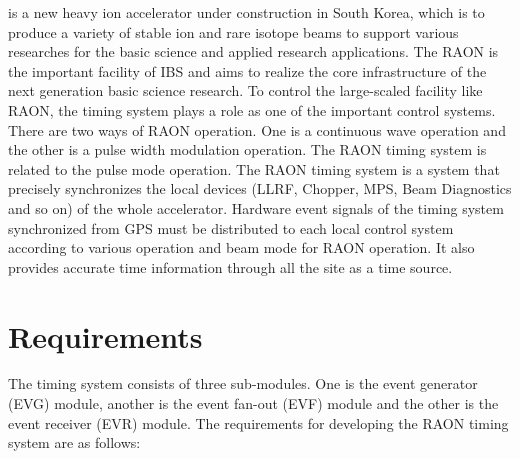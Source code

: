 \documentclass[journal]{IEEEtran}
\begin{document}
 is a new heavy ion accelerator under construction in South Korea, which is to produce a variety of stable ion and rare isotope beams to support various researches for the basic science and applied research applications\cite{risp}. The RAON is the important facility of IBS and aims to realize the core infrastructure of the next generation basic science research. To control the large-scaled facility like RAON, the timing system plays a role as one of the important control systems. There are two ways of RAON operation. One is a continuous wave operation and the other is a pulse width modulation operation. The RAON timing system is related to the pulse mode operation. The RAON timing system is a system that precisely synchronizes the local devices (LLRF, Chopper, MPS, Beam Diagnostics and so on) of the whole accelerator. Hardware event signals of the timing system synchronized from GPS must be distributed to each local control system according to various operation and beam mode for RAON operation. It also provides accurate time information through all the site as a time source.

\section{Requirements}
The timing system consists of three sub-modules. One is the event generator (EVG) module, another is the event fan-out (EVF) module and the other is the event receiver (EVR) module.
The requirements for developing the RAON timing system are as follows:
\end{document}
